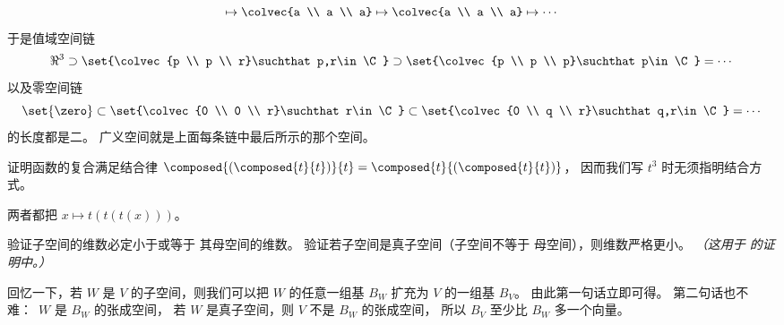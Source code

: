\begin{exercises}
\begin{answer}
\begin{exparts}
\begin{equation*}
                \mapsto\colvec{a \\ a \\ a}
                \mapsto\colvec{a \\ a \\ a}
                \mapsto\cdots
           \end{equation*}
           于是值域空间链
           \begin{equation*}
             \Re^3
               \supset\set{\colvec{p \\ p \\ r}\suchthat p,r\in\C}
               \supset\set{\colvec{p \\ p \\ p}\suchthat p\in\C}
               =\cdots
           \end{equation*}
           以及零空间链
           \begin{equation*}
             \set{\zero}
                \subset\set{\colvec{0 \\ 0 \\ r}\suchthat r\in \C}
                \subset\set{\colvec{0 \\ q \\ r}\suchthat q,r\in \C}
                =\cdots
           \end{equation*}
           的长度都是二。
           广义空间就是上面每条链中最后所示的那个空间。
       \end{exparts}
      \end{answer}
  \item
    证明函数的复合满足结合律
    \( \composed{(\composed{t}{t})}{t}=\composed{t}{(\composed{t}{t})} \)，
    因而我们写 $t^3$ 时无须指明结合方式。
    \begin{answer}
      两者都把 \( x\mapsto t(t(t(x))) \)。
    \end{answer}
  \item \label{exer:PropSubspStrictLowerDimen}
    验证子空间的维数必定小于或等于
    其母空间的维数。
    验证若子空间是真子空间（子空间不等于
    母空间），则维数严格更小。
    \textit{（这用于
              的证明中。）}
    \begin{answer}
      回忆一下，若 $W$ 是 $V$ 的子空间，则我们可以把
      $W$ 的任意一组基 $B_W$
      扩充为 $V$ 的一组基 $B_V$。
      由此第一句话立即可得。
      第二句话也不难：~$W$ 是 $B_W$ 的张成空间，
      若 $W$ 是真子空间，则 $V$ 不是 $B_W$ 的张成空间，
      所以 $B_V$ 至少比 $B_W$ 多一个向量。
    \end{answer}

\end{exercises}
